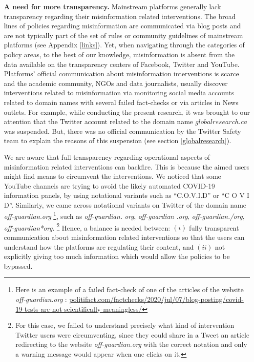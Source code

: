 \documentclass{article}
\begin{document}
{\bf A need for more transparency.} 
Mainstream platforms generally lack transparency regarding their misinformation related interventions.
The broad lines of policies regarding misinformation are communicated via blog posts and are not typically part of the set of rules or community guidelines of mainstream platforms (see Appendix \ref{links}).
Yet, when navigating through the categories of policy areas, to the best of our knowledge, misinformation is absent from the data available on the transparency centers of Facebook, Twitter and YouTube.
Platforms' official communication about misinformation interventions is scarce and the academic community, NGOs and data journalists, usually discover interventions related to misinformation via monitoring social media accounts related to domain names with several failed fact-checks or via articles in News outlets. 
For example, while conducting the present research, it was brought to our attention that the Twitter account related to the domain name $globalresearch.ca$ was suspended. 
But, there was no official communication by the Twitter Safety team to explain the reasons of this suspension (see section \ref{globalresearch}). 

We are aware that full transparency regarding operational aspects of misinformation related interventions can backfire.
This is because the aimed users might find means to circumvent the interventions. 
We noticed that some YouTube channels are trying to avoid the likely automated COVID-19 information panels, by using notational variants such as ``C.O.V.I.D'' or ``C O V I D''. 
Similarly, we came across notational variants on Twitter of the domain name {\it off-guardian.org}
\footnote{Here is an example of a failed fact-check of one of the articles of the website {\it off-guardian.org} : \href{https://www.politifact.com/factchecks/2020/jul/07/blog-posting/covid-19-tests-are-not-scientifically-meaningless/}{politifact.com/factchecks/2020/jul/07/blog-posting/covid-19-tests-are-not-scientifically-meaningless/}}, 
such as {\it off-guardian. org}, {\it off-guardian .org}, {\it off-guardian./org}, {\it off-guardian*org}.
\footnote{For this case, we failed to understand precisely what kind of intervention Twitter users were circumventing, since they could share in a Tweet an article redirecting to the website {\it off-guardian.org} with the correct notation and only a warning message would appear when one clicks on it.}
Hence, a balance is needed between: $(i)$ fully transparent communication about misinformation related interventions so that the users can understand how the platforms are regulating their content, and $(ii)$ not explicitly giving too much information which would allow the policies to be bypassed.
\end{document}
